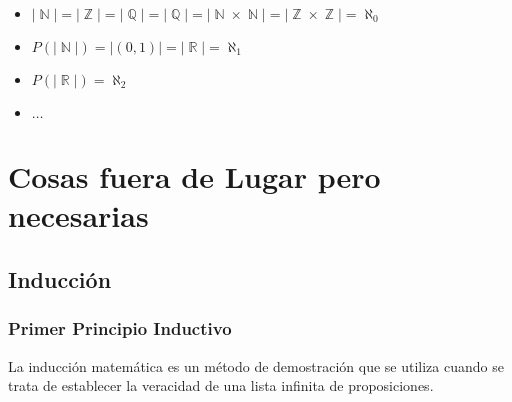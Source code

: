\documentclass[12pt, fleqn]{report}                             %
\theoremstyle{break}                                            %
\DeclareMathOperator \Naturals     {\mathbb{N}}                 %
\DeclareMathOperator \Integers     {\mathbb{Z}}                 %
\DeclareMathOperator \Racionals    {\mathbb{Q}}                 %
\DeclareMathOperator \Reals        {\mathbb{R}}                 %
\begin{document}
            \begin{itemize} 
                \item $|\Naturals| = |\Integers| = |\Racionals| = |\Racionals|
                                   = |\Naturals \times \Naturals| = |\Integers \times \Integers| = \aleph_0$

                \item $P(|\Naturals|) = |(0, 1)| = |\Reals| = \aleph_1$

                \item $P(|\Reals|) = \aleph_2$

                \item $\dots$

            \end{itemize} 








\part{Cosas fuera de Lugar pero necesarias}

    \chapter{Inducción}
        \clearpage



        \clearpage
        \section{Primer Principio Inductivo}

            La inducción matemática es un método de demostración que se utiliza cuando se trata
            de establecer la veracidad de una lista infinita de proposiciones.
\end{document}
